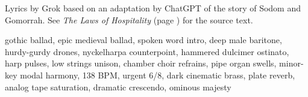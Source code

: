 
\begin{notes}
Lyrics by Grok based on an adaptation by ChatGPT of the story of Sodom and Gomorrah. See \emph{The Laws of Hospitality} (page \pageref{sec:laws-of-hospitality}) for the source text.
\end{notes}
\begin{style}
gothic ballad, epic medieval ballad, spoken word intro, deep male baritone, hurdy-gurdy drones, nyckelharpa counterpoint, hammered dulcimer ostinato, harp pulses, low strings unison, chamber choir refrains, pipe organ swells, minor-key modal harmony, 138 BPM, urgent 6/8, dark cinematic brass, plate reverb, analog tape saturation, dramatic crescendo, ominous majesty
\end{style}
